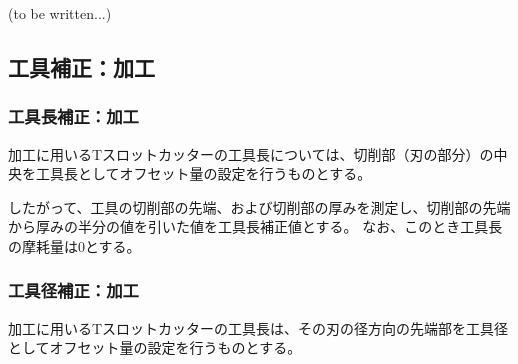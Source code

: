 \clearpage
(to be written...)


\clearpage


\subsection{工具補正：\Dimple 加工}

\subsubsection{工具長補正：\Dimple 加工}
\Dimple 加工に用いるTスロットカッターの工具長については、切削部（刃の部分）の中央を工具長としてオフセット量の設定を行うものとする。

したがって、工具の切削部の先端、および切削部の厚みを測定し、切削部の先端から厚みの半分の値を引いた値を工具長補正値とする。
なお、このとき工具長の摩耗量は0とする。

\subsubsection{工具径補正：\Dimple 加工}
\Dimple 加工に用いるTスロットカッターの工具長は、その刃の径方向の先端部を工具径としてオフセット量の設定を行うものとする。

